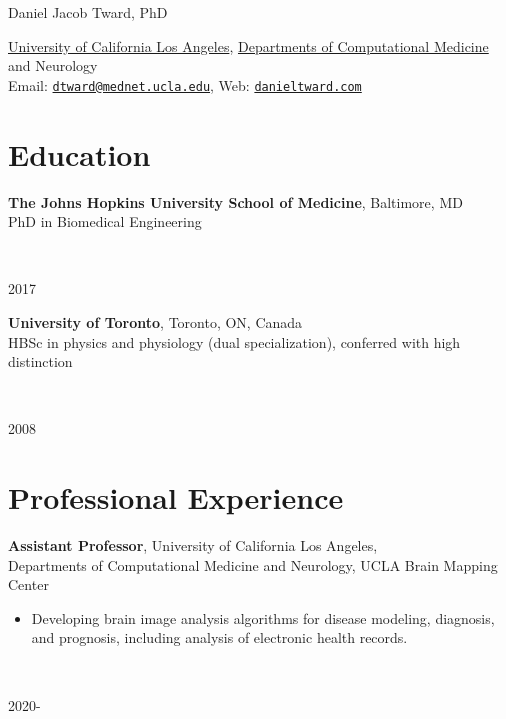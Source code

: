 \documentclass[letterpaper,11pt]{article}
\def\name{Daniel Jacob Tward, PhD}
\begin{document}
{\huge \name}




  \href{https://www.ucla.edu//}{University of California Los Angeles}, 
  \href{https://compmed.ucla.edu/}{Departments of Computational Medicine} and Neurology\\
Email: \href{mailto:dtward@mednet.ucla.edu}{\tt dtward@mednet.ucla.edu}, Web: \href{http://danieltward.com}{\tt danieltward.com}


\newcommand{\dancol}[2]{%
\begin{minipage}{5.9in}%
#1 %
\end{minipage}~%
\begin{minipage}{0.6in}%
\hfill%
#2%
\end{minipage}%
\vspace{1em}%
}


\section*{Education}
\vspace{-0.75em}

\dancol{\textbf{The Johns Hopkins University School of Medicine}, Baltimore, MD\\
PhD in Biomedical Engineering}{2017}

\dancol{\textbf{University of Toronto}, Toronto, ON, Canada\\HBSc in physics and physiology (dual specialization), conferred with high distinction}{2008}


\vspace{-1em}
\section*{Professional Experience}
\vspace{-0.75em}

\dancol{\textbf{Assistant Professor},
University of California Los Angeles, \\Departments of Computational Medicine and Neurology, UCLA Brain Mapping Center\\
\vspace{-0.3in}
\begin{itemize}[noitemsep]
\item 

Developing brain image analysis algorithms for disease modeling, diagnosis, and prognosis, including analysis of electronic health records.

\end{itemize}
}{2020-\phantom{20}}
\end{document}
